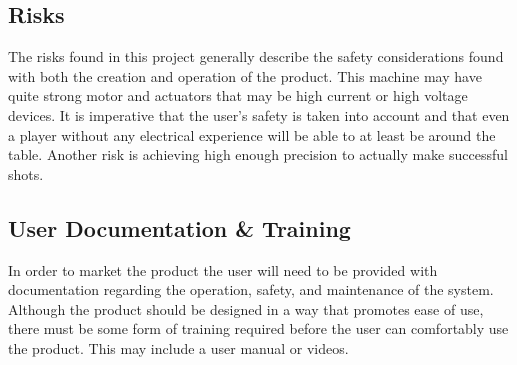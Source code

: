 \documentclass[titlepage]{article}
\begin{document}
\subsection{Risks}
The risks found in this project generally describe the safety considerations found with both the creation and operation of the product. This machine may have quite strong motor and actuators that may be high current or high voltage devices. It is imperative that the user's safety is taken into account and that even a player without any electrical experience will be able to at least be around the table. Another risk is achieving high enough precision to actually make successful shots.

\subsection{User Documentation \& Training}
In order to market the product the user will need to be provided with documentation regarding the operation, safety, and maintenance of the system. Although the product should be designed in a way that promotes ease of use, there must be some form of training required before the user can comfortably use the product. This may include a user manual or videos.




\pagebreak
\printindex
\end{document}
